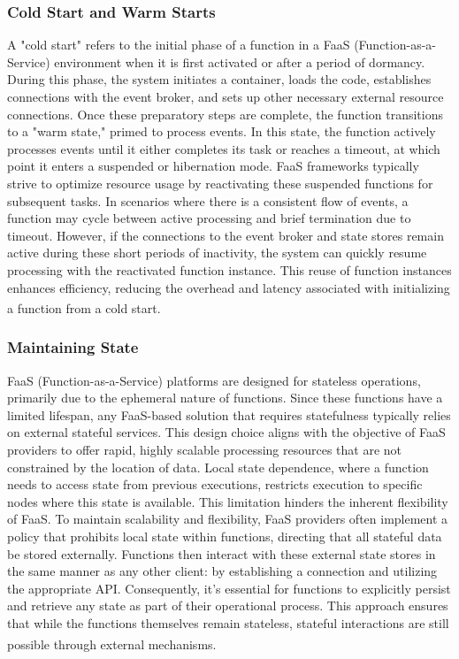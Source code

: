 \subsubsection{Cold Start and Warm Starts}
A "cold start" refers to the initial phase of a function in a FaaS (Function-as-a-Service)
environment when it is first activated or after a period of dormancy. During this phase, the system
initiates a container, loads the code, establishes connections with the event broker, and sets up
other necessary external resource connections. Once these preparatory steps are complete, the
function transitions to a "warm state," primed to process events. In this state, the function
actively processes events until it either completes its task or reaches a timeout, at which point it
enters a suspended or hibernation mode.\newline\newline
FaaS frameworks typically strive to optimize resource usage by reactivating these suspended
functions for subsequent tasks. In scenarios where there is a consistent flow of events, a function
may cycle between active processing and brief termination due to timeout. However, if the
connections to the event broker and state stores remain active during these short periods of
inactivity, the system can quickly resume processing with the reactivated function instance. This
reuse of function instances enhances efficiency, reducing the overhead and latency associated with
initializing a function from a cold start\textsuperscript{\cite{event_book}}.

\subsubsection{Maintaining State}
FaaS (Function-as-a-Service) platforms are designed for stateless operations, primarily due to the
ephemeral nature of functions. Since these functions have a limited lifespan, any FaaS-based
solution that requires statefulness typically relies on external stateful services. This design
choice aligns with the objective of FaaS providers to offer rapid, highly scalable processing
resources that are not constrained by the location of data. Local state dependence, where a function
needs to access state from previous executions, restricts execution to specific nodes where this
state is available. This limitation hinders the inherent flexibility of FaaS.\newline\newline
To maintain scalability and flexibility, FaaS providers often implement a policy that prohibits
local state within functions, directing that all stateful data be stored externally. Functions then
interact with these external state stores in the same manner as any other client: by establishing a
connection and utilizing the appropriate API. Consequently, it's essential for functions to
explicitly persist and retrieve any state as part of their operational process. This approach
ensures that while the functions themselves remain stateless, stateful interactions are still
possible through external mechanisms\textsuperscript{\cite{event_book}}.

